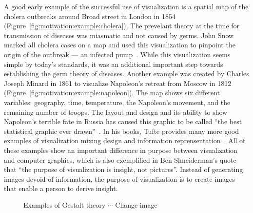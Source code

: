A good early example of the successful use of visualization is a spatial map of the cholera outbreaks around Broad street in London in 1854 (Figure~\ref{fig:motivation:example:cholera}).  The prevelant theory at the time for transmission of diseases was miasmatic and not caused by germs.  John Snow marked all cholera cases on a map and used this visualization to pinpoint the origin of the outbreak --- an infected pump~\cite{snow1855mode}.  While this visualization seems simple by today's standards, it was an additional important step towards establishing the germ theory of diseases.  Another example was created by Charles Joseph Minard in 1861 to visualize Napoleon's retreat from Moscow in 1812 (Figure~\ref{fig:motivation:example:napoleon}).  The map shows six different variables: geography, time, temperature, the Napoleon’s movement, and the remaining number of troops.  The layout and design and its ability to show Napoleon's terrible fate in Russia has caused this graphic to be called ``the best statistical graphic ever drawn''~\cite{tufte1983visual}.  In his books, Tufte provides many more good examples of visualization mixing design and information reprensentation~\cite{tufte1991envisioning}.  All of these examples show an important difference in purpose between visualization and computer graphics, which is also exemplified in Ben Shneiderman's quote that ``the purpose of visualization is insight, not pictures''.  Instead of generating images devoid of information, the purpose of visualization is to create images that enable a person to derive insight.

\begin{figure}
  \centering
  \caption{Examples of Gestalt theory $\cdots$ Change image}
  \label{fig:motivation:gestalt}
\end{figure}

